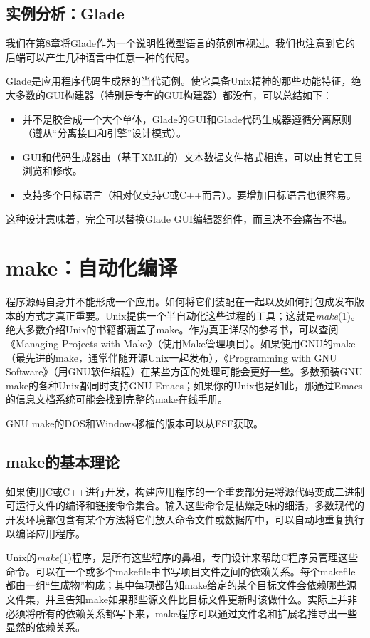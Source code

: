 \documentclass[12pt,oneside]{book}
\begin{document}
\begin{common-format}
\subsection{实例分析：Glade}
我们在第8章将Glade作为一个说明性微型语言的范例审视过。我们也注意到它的后端可以产生几种语言中任意一种的代码。

Glade是应用程序代码生成器的当代范例。使它具备Unix精神的那些功能特征，绝大多数的GUI构建器（特别是专有的GUI构建器）都没有，可以总结如下：
\begin{itemize}
\item 并不是胶合成一个大个单体，Glade的GUI和Glade代码生成器遵循分离原则（遵从“分离接口和引擎”设计模式）。
\item GUI和代码生成器由（基于XML的）文本数据文件格式相连，可以由其它工具浏览和修改。
\item 支持多个目标语言（相对仅支持C或C++而言）。要增加目标语言也很容易。
\end{itemize}

这种设计意味着，完全可以替换Glade GUI编辑器组件，而且决不会痛苦不堪。

\section{make：自动化编译}
程序源码自身并不能形成一个应用。如何将它们装配在一起以及如何打包成发布版本的方式才真正重要。Unix提供一个半自动化这些过程的工具；这就是\textit{make}(1)。绝大多数介绍Unix的书籍都涵盖了make。作为真正详尽的参考书，可以查阅《Managing Projects with Make》（使用Make管理项目）\cite{Oram-Talbot}。如果使用GNU的make（最先进的make，通常伴随开源Unix一起发布），《Programming with GNU Software》（用GNU软件编程）\cite{Loukides-Oram}在某些方面的处理可能会更好一些。多数预装GNU make的各种Unix都同时支持GNU Emacs；如果你的Unix也是如此，那通过Emacs的信息文档系统可能会找到完整的make在线手册。

GNU make的DOS和Windows移植的版本可以从FSF获取。

\subsection{make的基本理论}
如果使用C或C++进行开发，构建应用程序的一个重要部分是将源代码变成二进制可运行文件的编译和链接命令集合。输入这些命令是枯燥乏味的细活，多数现代的开发环境都包含有某个方法将它们放入命令文件或数据库中，可以自动地重复执行以编译应用程序。

Unix的\textit{make}(1)程序，是所有这些程序的鼻祖，专门设计来帮助C程序员管理这些命令。可以在一个或多个makefile中书写项目文件之间的依赖关系。每个makefile都由一组“生成物”构成；其中每项都告知make给定的某个目标文件会依赖哪些源文件集，并且告知make如果那些源文件比目标文件更新时该做什么。实际上并非必须将所有的依赖关系都写下来，make程序可以通过文件名和扩展名推导出一些显然的依赖关系。


\end{common-format}
\end{document}
